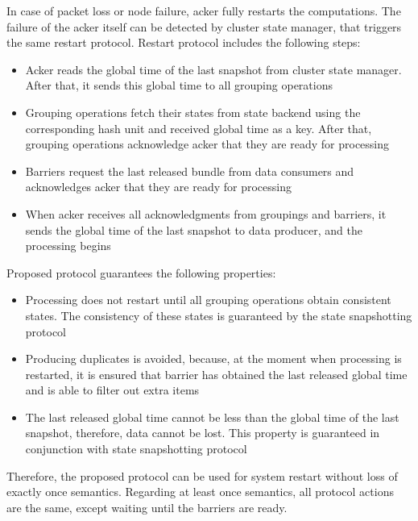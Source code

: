 In case of packet loss or node failure, acker fully restarts the computations. The failure of the acker itself can be detected by cluster state manager, that triggers the same restart protocol. Restart protocol includes the following steps:

\begin{itemize}
    \item Acker reads the global time of the last snapshot from cluster state manager. After that, it sends this global time to all grouping operations
    \item Grouping operations fetch their states from state backend using the corresponding hash unit and received global time as a key. After that, grouping operations acknowledge acker that they are ready for processing 
    \item Barriers request the last released bundle from data consumers and acknowledges acker that they are ready for processing
    \item When acker receives all acknowledgments from groupings and barriers, it sends the global time of the last snapshot to data producer, and the processing begins 
\end{itemize}

Proposed protocol guarantees the following properties:

\begin{itemize}
    \item Processing does not restart until all grouping operations obtain consistent states. The consistency of these states is guaranteed by the state snapshotting protocol
    \item Producing duplicates is avoided, because, at the moment when processing is restarted, it is ensured that barrier has obtained the last released global time and is able to filter out extra items
    \item The last released global time cannot be less than the global time of the last snapshot, therefore, data cannot be lost. This property is guaranteed in conjunction with state snapshotting protocol
\end{itemize}

Therefore, the proposed protocol can be used for system restart without loss of exactly once semantics. Regarding at least once semantics, all protocol actions are the same, except waiting until the barriers are ready.
